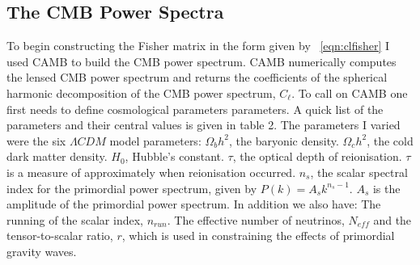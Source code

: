 \subsection{The CMB Power Spectra}

To begin constructing the Fisher matrix in the form given by ~\ref{eqn:clfisher} I used CAMB \cite{Challinor:2005jy} to build the CMB power spectrum. CAMB numerically computes the lensed CMB power spectrum and returns the coefficients of the spherical harmonic decomposition of the CMB power spectrum, $C_{\ell}$. To call on CAMB one first needs to define cosmological parameters parameters. A quick list of the parameters and their central values is given in table 2. The parameters I varied were the six $\Lambda CDM$ model parameters: $\Omega_{b}h^{2}$, the baryonic density. $\Omega_{c}h^{2}$, the cold dark matter density. $H_0$, Hubble's constant. $\tau$, the optical depth of reionisation. $\tau$ is a measure of approximately when reionisation occurred. $n_s$, the scalar spectral index for the primordial power spectrum, given by $P(k) = A_s k^{n_s - 1}$. $A_s$ is the amplitude of the primordial power spectrum. In addition we also have: The running of the scalar index, $n_{run}$. The effective number of neutrinos, $N_{eff}$ and the tensor-to-scalar ratio, $r$, which is used in constraining the effects of primordial gravity waves.

